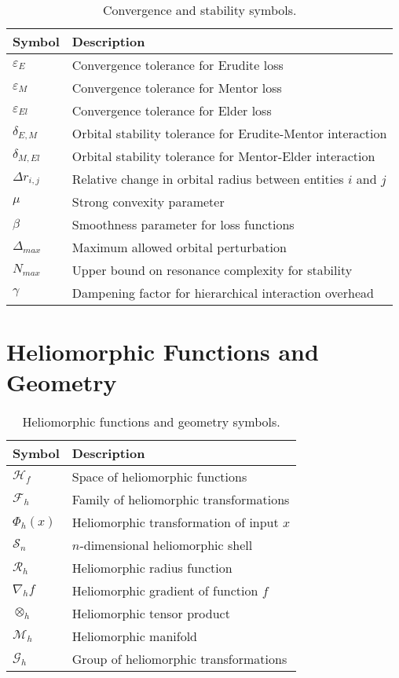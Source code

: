 \begin{table}[h]
\centering
\begin{tabular}{|l|p{10cm}|}
\hline
\textbf{Symbol} & \textbf{Description} \\
\hline
$\varepsilon_E$ & Convergence tolerance for Erudite loss \\
\hline
$\varepsilon_M$ & Convergence tolerance for Mentor loss \\
\hline
$\varepsilon_{El}$ & Convergence tolerance for Elder loss \\
\hline
$\delta_{E,M}$ & Orbital stability tolerance for Erudite-Mentor interaction \\
\hline
$\delta_{M,El}$ & Orbital stability tolerance for Mentor-Elder interaction \\
\hline
$\Delta r_{i,j}$ & Relative change in orbital radius between entities $i$ and $j$ \\
\hline
$\mu$ & Strong convexity parameter \\
\hline
$\beta$ & Smoothness parameter for loss functions \\
\hline
$\Delta_{max}$ & Maximum allowed orbital perturbation \\
\hline
$N_{max}$ & Upper bound on resonance complexity for stability \\
\hline
$\gamma$ & Dampening factor for hierarchical interaction overhead \\
\hline
\end{tabular}
\caption{Convergence and stability symbols.}
\label{tab:symbols_convergence}
\end{table}

\section{Heliomorphic Functions and Geometry}

\begin{table}[h]
\centering
\begin{tabular}{|l|p{10cm}|}
\hline
\textbf{Symbol} & \textbf{Description} \\
\hline
$\mathcal{H}_f$ & Space of heliomorphic functions \\
\hline
$\mathcal{F}_h$ & Family of heliomorphic transformations \\
\hline
$\Phi_h(x)$ & Heliomorphic transformation of input $x$ \\
\hline
$\mathcal{S}_n$ & $n$-dimensional heliomorphic shell \\
\hline
$\mathcal{R}_h$ & Heliomorphic radius function \\
\hline
$\nabla_h f$ & Heliomorphic gradient of function $f$ \\
\hline
$\otimes_h$ & Heliomorphic tensor product \\
\hline
$\mathcal{M}_h$ & Heliomorphic manifold \\
\hline
$\mathcal{G}_h$ & Group of heliomorphic transformations \\
\hline
\end{tabular}
\caption{Heliomorphic functions and geometry symbols.}
\label{tab:symbols_heliomorphic}
\end{table}

